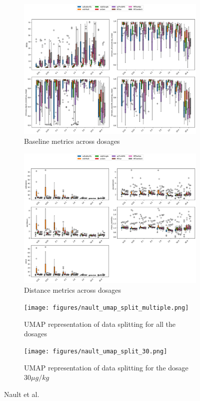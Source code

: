 \documentclass[12pt, a4paper]{article}
\begin{document}
\begin{figure}[h!]
    \begin{subfigure}[b]{0.48\textwidth}
        \centering
        \includegraphics[width=\textwidth]{selected_benchmarking_doses_baseline_metrics_nault.png}
        \caption{Baseline metrics across dosages}
        \label{}
    \end{subfigure}
    \begin{subfigure}[b]{0.48\textwidth}
        \centering
        \includegraphics[width=.9\textwidth]{selected_benchmarking_doses_distance_metrics_nault.png}
        \caption{Distance metrics across dosages}
        \label{}
    \end{subfigure}
    \begin{subfigure}[b]{0.48\textwidth}
        \centering
        \texttt{[image: figures/nault\_umap\_split\_multiple.png]}
        \caption{UMAP representation of data splitting for all the dosages}
        \label{}
    \end{subfigure}
    \begin{subfigure}[b]{0.48\textwidth}
        \centering
        \texttt{[image: figures/nault\_umap\_split\_30.png]}
        \caption{UMAP representation of data splitting for the dosage $30 \mu g/kg$}
        \label{}
    \end{subfigure}       
    \caption{Nault et al. \cite{nault2021single,nault2022benchmarking}}
    \label{fig:eval_nault}
\end{figure}
\end{document}
